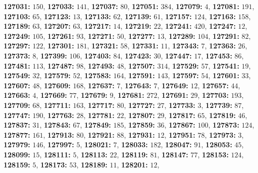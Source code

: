 \textsf{\bfseries 127031:} $150$, \textsf{\bfseries 127033:} $141$, \textsf{\bfseries 127037:} $80$, \textsf{\bfseries 127051:} $384$, \textsf{\bfseries 127079:} $4$, \textsf{\bfseries 127081:} $191$, \textsf{\bfseries 127103:} $65$, \textsf{\bfseries 127123:} $13$, \textsf{\bfseries 127133:} $62$, \textsf{\bfseries 127139:} $61$, \textsf{\bfseries 127157:} $124$, \textsf{\bfseries 127163:} $158$, \textsf{\bfseries 127189:} $63$, \textsf{\bfseries 127207:} $63$, \textsf{\bfseries 127217:} $14$, \textsf{\bfseries 127219:} $22$, \textsf{\bfseries 127241:} $420$, \textsf{\bfseries 127247:} $12$, \textsf{\bfseries 127249:} $105$, \textsf{\bfseries 127261:} $93$, \textsf{\bfseries 127271:} $50$, \textsf{\bfseries 127277:} $13$, \textsf{\bfseries 127289:} $104$, \textsf{\bfseries 127291:} $82$, \textsf{\bfseries 127297:} $122$, \textsf{\bfseries 127301:} $181$, \textsf{\bfseries 127321:} $58$, \textsf{\bfseries 127331:} $11$, \textsf{\bfseries 127343:} $7$, \textsf{\bfseries 127363:} $26$, \textsf{\bfseries 127373:} $8$, \textsf{\bfseries 127399:} $106$, \textsf{\bfseries 127403:} $84$, \textsf{\bfseries 127423:} $30$, \textsf{\bfseries 127447:} $17$, \textsf{\bfseries 127453:} $86$, \textsf{\bfseries 127481:} $113$, \textsf{\bfseries 127487:} $98$, \textsf{\bfseries 127493:} $48$, \textsf{\bfseries 127507:} $314$, \textsf{\bfseries 127529:} $57$, \textsf{\bfseries 127541:} $19$, \textsf{\bfseries 127549:} $32$, \textsf{\bfseries 127579:} $52$, \textsf{\bfseries 127583:} $164$, \textsf{\bfseries 127591:} $143$, \textsf{\bfseries 127597:} $54$, \textsf{\bfseries 127601:} $33$, \textsf{\bfseries 127607:} $48$, \textsf{\bfseries 127609:} $168$, \textsf{\bfseries 127637:} $7$, \textsf{\bfseries 127643:} $7$, \textsf{\bfseries 127649:} $12$, \textsf{\bfseries 127657:} $44$, \textsf{\bfseries 127663:} $4$, \textsf{\bfseries 127669:} $77$, \textsf{\bfseries 127679:} $9$, \textsf{\bfseries 127681:} $272$, \textsf{\bfseries 127691:} $29$, \textsf{\bfseries 127703:} $193$, \textsf{\bfseries 127709:} $68$, \textsf{\bfseries 127711:} $163$, \textsf{\bfseries 127717:} $80$, \textsf{\bfseries 127727:} $27$, \textsf{\bfseries 127733:} $3$, \textsf{\bfseries 127739:} $87$, \textsf{\bfseries 127747:} $190$, \textsf{\bfseries 127763:} $28$, \textsf{\bfseries 127781:} $22$, \textsf{\bfseries 127807:} $29$, \textsf{\bfseries 127817:} $65$, \textsf{\bfseries 127819:} $46$, \textsf{\bfseries 127837:} $31$, \textsf{\bfseries 127843:} $67$, \textsf{\bfseries 127849:} $185$, \textsf{\bfseries 127859:} $36$, \textsf{\bfseries 127867:} $100$, \textsf{\bfseries 127873:} $124$, \textsf{\bfseries 127877:} $161$, \textsf{\bfseries 127913:} $80$, \textsf{\bfseries 127921:} $88$, \textsf{\bfseries 127931:} $12$, \textsf{\bfseries 127951:} $78$, \textsf{\bfseries 127973:} $3$, \textsf{\bfseries 127979:} $146$, \textsf{\bfseries 127997:} $5$, \textsf{\bfseries 128021:} $7$, \textsf{\bfseries 128033:} $182$, \textsf{\bfseries 128047:} $91$, \textsf{\bfseries 128053:} $45$, \textsf{\bfseries 128099:} $15$, \textsf{\bfseries 128111:} $5$, \textsf{\bfseries 128113:} $22$, \textsf{\bfseries 128119:} $81$, \textsf{\bfseries 128147:} $77$, \textsf{\bfseries 128153:} $124$, \textsf{\bfseries 128159:} $5$, \textsf{\bfseries 128173:} $53$, \textsf{\bfseries 128189:} $11$, \textsf{\bfseries 128201:} $12$, 
